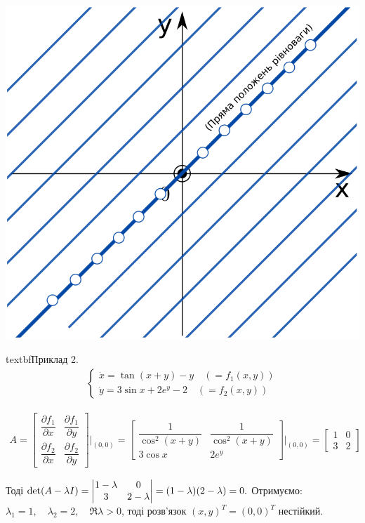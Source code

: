     \begin{center} \includegraphics[scale=0.3]{assets/lectures_recent-49093f01.png} \end{center}




    textbf{Приклад 2.}
    \begin{gather*}
      \begin{cases}
         \dot{x} = \tan(x+y) - y \quad  (=f_1(x, y))\\
         \dot{y} = 3\sin{x} + 2e^y - 2 \quad (=f_2(x, y))
      \end{cases}
    \end{gather*}
    \begin{spacing}{2.5}
    \begin{gather*}
      A = \begin{bmatrix}
        \dfrac{\partial f_1}{\partial x}   &   \dfrac{\partial f_1}{\partial y} \\
        \dfrac{\partial f_2}{\partial x}   &   \dfrac{\partial f_2}{\partial y}
      \end{bmatrix} \Bigg|_{(0,0)} =
      \begin{bmatrix}
       \dfrac{1}{\cos^2(x+y)} & \dfrac{1}{\cos^2(x+y)}  \\
       3\cos{x} & 2e^y
     \end{bmatrix}\Bigg|_{(0,0)}  =
     \begin{bmatrix}
      1 & 0  \\
      3 & 2
      \end{bmatrix}
    \end{gather*}
    \end{spacing}

    Тоді $\det(A - \lambda I) =  \begin{vmatrix} 1 - \lambda & 0 \\ 3 & 2 - \lambda \end{vmatrix} = (1 - \lambda)(2 - \lambda) = 0. \\ $ Отримуємо: $\lambda_1 = 1, \quad \lambda_2 = 2, \quad \Re \lambda > 0$, тоді розв'язок $(x, y)^T = (0, 0)^T $ нестійкий.\\
